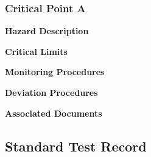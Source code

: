 




\subsubsection{Critical Point A}

\textbf{Hazard Description}

\textbf{Critical Limits}

\textbf{Monitoring Procedures}

\textbf{Deviation Procedures}

\textbf{Associated Documents}


\subsection{Standard Test Record}




